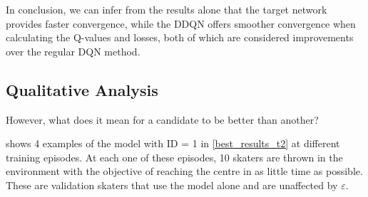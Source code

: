 In conclusion, we can infer from the results alone that the target network provides faster convergence, while the DDQN offers smoother convergence when calculating the Q-values and losses, both of which are considered improvements over the regular DQN method.

\subsection{Qualitative Analysis}

However, what does it mean for a candidate to be better than another?

 shows 4 examples of the model with ID = 1 in \cref{best_results_t2} at different training episodes.
At each one of these episodes, 10 skaters are thrown in the environment with the objective of reaching the centre in as little time as possible.
These are validation skaters that use the model alone and are unaffected by $\varepsilon$.

